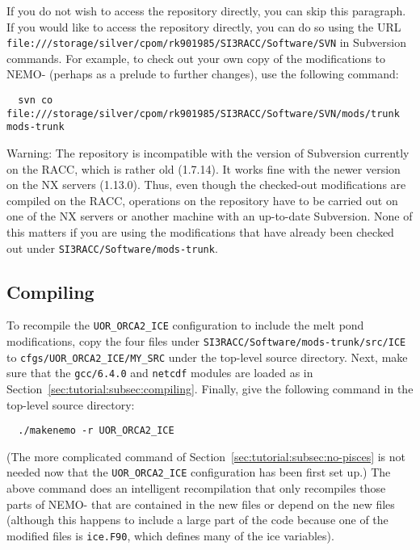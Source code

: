 If you do not wish to access the repository directly, you can skip this paragraph.
If you would like to access the repository directly, you can do so using the URL \verb|file:///storage/silver/cpom/rk901985/SI3RACC/Software/SVN| in Subversion commands.
For example, to check out your own copy of the modifications to NEMO-\SIcu{} (perhaps as a prelude to further changes), use the following command:

\begin{verbatim}
  svn co file:///storage/silver/cpom/rk901985/SI3RACC/Software/SVN/mods/trunk mods-trunk
\end{verbatim}

\noindent{}Warning: The repository is incompatible with the version of Subversion currently on the RACC, which is rather old (1.7.14).
It works fine with the newer version on the NX servers (1.13.0).
Thus, even though the checked-out modifications are compiled on the RACC, operations on the repository have to be carried out on one of the NX servers or another machine with an up-to-date Subversion.
None of this matters if you are using the modifications that have already been checked out under \verb|SI3RACC/Software/mods-trunk|.


\subsection{Compiling}
\label{sec:mods:subsec:compiling}

To recompile the \verb|UOR_ORCA2_ICE| configuration to include the melt pond modifications, copy the four files under \verb|SI3RACC/Software/mods-trunk/src/ICE| to \verb|cfgs/UOR_ORCA2_ICE/MY_SRC| under the top-level source directory.
Next, make sure that the \verb|gcc/6.4.0| and \verb|netcdf| modules are loaded as in Section~\ref{sec:tutorial:subsec:compiling}.
Finally, give the following command in the top-level source directory:

\begin{verbatim}
  ./makenemo -r UOR_ORCA2_ICE
\end{verbatim}

\noindent{}(The more complicated command of Section~\ref{sec:tutorial:subsec:no-pisces} is not needed now that the \verb|UOR_ORCA2_ICE| configuration has been first set up.)
The above command does an intelligent recompilation that only recompiles those parts of NEMO-\SIcu{} that are contained in the new files or depend on the new files (although this happens to include a large part of the code because one of the modified files is \verb|ice.F90|, which defines many of the ice variables).


